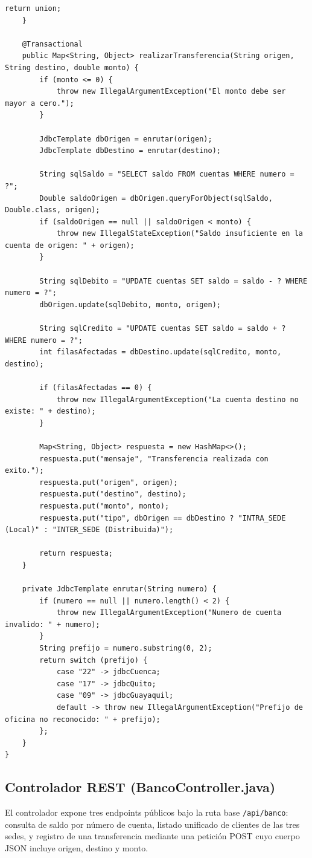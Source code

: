 \documentclass[11pt,a4paper]{article}
\begin{document}
\begin{lstlisting}[style=java]
        return union;
    }

    @Transactional
    public Map<String, Object> realizarTransferencia(String origen, String destino, double monto) {
        if (monto <= 0) {
            throw new IllegalArgumentException("El monto debe ser mayor a cero.");
        }

        JdbcTemplate dbOrigen = enrutar(origen);
        JdbcTemplate dbDestino = enrutar(destino);

        String sqlSaldo = "SELECT saldo FROM cuentas WHERE numero = ?";
        Double saldoOrigen = dbOrigen.queryForObject(sqlSaldo, Double.class, origen);
        if (saldoOrigen == null || saldoOrigen < monto) {
            throw new IllegalStateException("Saldo insuficiente en la cuenta de origen: " + origen);
        }

        String sqlDebito = "UPDATE cuentas SET saldo = saldo - ? WHERE numero = ?";
        dbOrigen.update(sqlDebito, monto, origen);

        String sqlCredito = "UPDATE cuentas SET saldo = saldo + ? WHERE numero = ?";
        int filasAfectadas = dbDestino.update(sqlCredito, monto, destino);

        if (filasAfectadas == 0) {
            throw new IllegalArgumentException("La cuenta destino no existe: " + destino);
        }

        Map<String, Object> respuesta = new HashMap<>();
        respuesta.put("mensaje", "Transferencia realizada con exito.");
        respuesta.put("origen", origen);
        respuesta.put("destino", destino);
        respuesta.put("monto", monto);
        respuesta.put("tipo", dbOrigen == dbDestino ? "INTRA_SEDE (Local)" : "INTER_SEDE (Distribuida)");

        return respuesta;
    }

    private JdbcTemplate enrutar(String numero) {
        if (numero == null || numero.length() < 2) {
            throw new IllegalArgumentException("Numero de cuenta invalido: " + numero);
        }
        String prefijo = numero.substring(0, 2);
        return switch (prefijo) {
            case "22" -> jdbcCuenca;
            case "17" -> jdbcQuito;
            case "09" -> jdbcGuayaquil;
            default -> throw new IllegalArgumentException("Prefijo de oficina no reconocido: " + prefijo);
        };
    }
}
\end{lstlisting}

\subsection{Controlador REST (BancoController.java)}
El controlador expone tres endpoints públicos bajo la ruta base \texttt{/api/banco}: consulta de saldo por número de cuenta, listado unificado de clientes de las tres sedes, y registro de una transferencia mediante una petición POST cuyo cuerpo JSON incluye origen, destino y monto.
\end{document}
